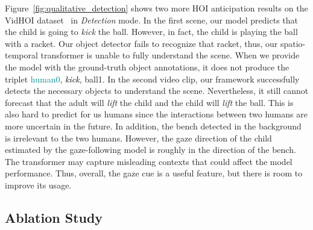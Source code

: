 \documentclass[times,twocolumn,final,authoryear]{elsarticle}
\begin{document}
Figure~\ref{fig:qualitative_detection} shows two more HOI anticipation results on the VidHOI dataset~\citep{hoi_v_set:VidHOI} in \emph{Detection} mode. In the first scene, our model predicts that the child is going to \emph{kick} the \textcolor{darkpurple}{ball}. However, in fact, the child is playing the ball with a racket. Our object detector fails to recognize that racket, thus, our spatio-temporal transformer is unable to fully understand the scene. When we provide the model with the ground-truth object annotations, it does not produce the triplet \textcolor{darkcyan}{human0}, \textcolor{black}{\emph{kick}}, \textcolor{darkpurple}{ball1}. In the second video clip, our framework successfully detects the necessary objects to understand the scene. Nevertheless, it still cannot forecast that the adult will \emph{lift} the child and the child will \emph{lift} the ball. This is also hard to predict for us humans since the interactions between two humans are more uncertain in the future. In addition, the bench detected in the background is irrelevant to the two humans. However, the gaze direction of the child estimated by the gaze-following model is roughly in the direction of the bench. The transformer may capture misleading contexts that could affect the model performance. Thus, overall, the gaze cue is a useful feature, but there is room to improve its usage. 

\subsection{Ablation Study}
\end{document}
